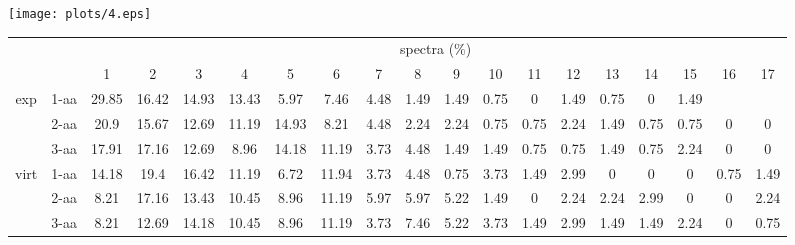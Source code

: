 \documentclass{article}
\begin{document}
\texttt{[image: plots/4.eps]}\begin{table}[h]\tiny
\vspace{3mm}
{\centering
\begin{center}
\begin{tabular}{|c|l|c|c|c|c|c|c|c|c|c|c|c|c|c|c|c|c|c|}
  \hline
  \multicolumn{2}{|c|}{ } & \multicolumn{ 17 }{|c|}{ spectra (\%)} \\
  \cline{3- 19}
  \multicolumn{2}{|c|}{ }  & 1 & 2 & 3 & 4 & 5 & 6 & 7 & 8 & 9 & 10 & 11 & 12 & 13 & 14 & 15 & 16 & 17\\
  \hline
  \multirow{3}{*}{exp}
&  1-aa  & 29.85 & 16.42 & 14.93 & 13.43 & 5.97 & 7.46 & 4.48 & 1.49 & 1.49 & 0.75 & 0 & 1.49 & 0.75 & 0 & 1.49 &  & \\&  2-aa  & 20.9 & 15.67 & 12.69 & 11.19 & 14.93 & 8.21 & 4.48 & 2.24 & 2.24 & 0.75 & 0.75 & 2.24 & 1.49 & 0.75 & 0.75 & 0 & 0\\&  3-aa  & 17.91 & 17.16 & 12.69 & 8.96 & 14.18 & 11.19 & 3.73 & 4.48 & 1.49 & 1.49 & 0.75 & 0.75 & 1.49 & 0.75 & 2.24 & 0 & 0\\ \hline
  \multirow{3}{*}{virt} 
&  1-aa  & 14.18 & 19.4 & 16.42 & 11.19 & 6.72 & 11.94 & 3.73 & 4.48 & 0.75 & 3.73 & 1.49 & 2.99 & 0 & 0 & 0 & 0.75 & 1.49\\&  2-aa  & 8.21 & 17.16 & 13.43 & 10.45 & 8.96 & 11.19 & 5.97 & 5.97 & 5.22 & 1.49 & 0 & 2.24 & 2.24 & 2.99 & 0 & 0 & 2.24\\&  3-aa  & 8.21 & 12.69 & 14.18 & 10.45 & 8.96 & 11.19 & 3.73 & 7.46 & 5.22 & 3.73 & 1.49 & 2.99 & 1.49 & 1.49 & 2.24 & 0 & 0.75\\ \hline
\end{tabular}
\end{center}
\par}
\centering
\vspace{3mm}
\label{table:table4}
\end{table}
\end{document}
